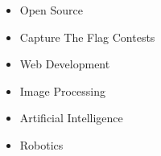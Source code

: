 
{\fontsize{11pt}{1em}\bodyfontlight\upshape\color{text}
  \begin{itemize}
  \item Open Source
  \item Capture The Flag Contests
  \item Web Development
  \item Image Processing
  \item Artificial Intelligence
  \item Robotics
  \end{itemize}
}

